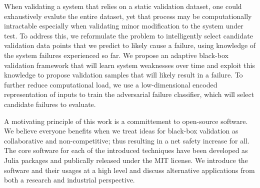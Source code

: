 When validating a system that relies on a static validation dataset, one could exhaustively evalute the entire dataset, yet that process may be computationally intractable especially when validating minor modification to the system under test.
To address this, we reformulate the problem to intelligently select candidate validation data points that we predict to likely cause a failure, using knowledge of the system failures experienced so far.
We propose an adaptive black-box validation framework that will learn system weaknesses over time and exploit this knowledge to propose validation samples that will likely result in a failure.
To further reduce computational load, we use a low-dimensional encoded representation of inputs to train the adversarial failure classifier, which will select candidate failures to evaluate.

A motivating principle of this work is a committement to open-source software.
We believe everyone benefits when we treat ideas for black-box validation as collaborative and non-competitive; thus resulting in a net safety increase for all.
The core software for each of the introduced techniques have been developed as Julia packages and publically released under the MIT license.
We introduce the software and their usages at a high level and discuss alternative applications from both a research and industrial perspective.